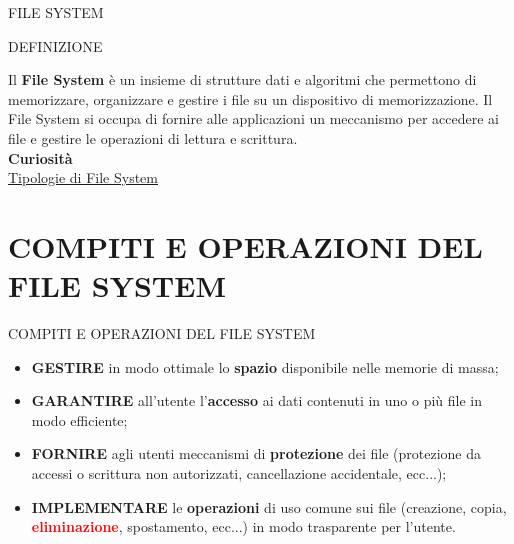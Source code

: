 \documentclass[aspectratio=1610]{beamer}
\begin{document}
\begin{frame}{FILE SYSTEM}
    \begin{alertblock}{DEFINIZIONE}
        \begin{minipage}{0.98\linewidth}
            \justifying
            Il \textbf{File System} è un insieme di strutture dati e algoritmi che permettono di memorizzare, 
            organizzare e gestire i file su un dispositivo di memorizzazione. Il File System si occupa di fornire 
            alle applicazioni un meccanismo per accedere ai file e gestire le operazioni di lettura e scrittura.\\
            \bigskip
            \tiny{\textbf{Curiosità}}\\
            \tiny{\href{https://it.wikipedia.org/wiki/File_system}{Tipologie di File System}}
        \end{minipage}
    \end{alertblock}
\end{frame}

\section{COMPITI E OPERAZIONI DEL FILE SYSTEM}

\begin{frame}{COMPITI E OPERAZIONI DEL FILE SYSTEM}
    \begin{itemize}
        \item \textbf{GESTIRE} in modo ottimale lo \textbf{spazio} disponibile nelle memorie di massa;
        \pause
        \item \textbf{GARANTIRE} all'utente l'\textbf{accesso} ai dati contenuti in uno o più file in modo efficiente;
        \pause
        \item \textbf{FORNIRE} agli utenti meccanismi di \textbf{protezione} dei file (protezione da accessi o scrittura non autorizzati, 
        cancellazione accidentale, ecc...);
        \pause
        \item \textbf{IMPLEMENTARE} le \textbf{operazioni} di uso comune sui ﬁle (creazione, copia, \textcolor{red}{\textbf{eliminazione}}, spostamento, ecc...) in modo 
        trasparente per l'utente.
    \end{itemize}
\end{frame}
\end{document}
